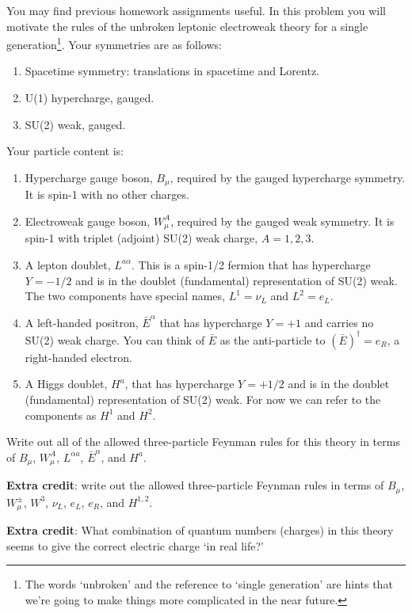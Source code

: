 \documentclass[12pt]{article}
\numberwithin{equation}{section}    %
\begin{document}
You may find previous homework assignments useful. In this problem you will motivate the rules of the unbroken leptonic electroweak theory for a single generation\footnote{The words `unbroken' and the reference to `single generation' are hints that we're going to make things more complicated in the near future.}. Your symmetries are as follows:
\begin{enumerate}
	\item Spacetime symmetry: translations in spacetime and Lorentz.
	\item U(1) hypercharge, gauged.
	\item SU(2) weak, gauged.
\end{enumerate}
Your particle content is:
\begin{enumerate}
	\item Hypercharge gauge boson, $B_\mu$, required by the gauged hypercharge symmetry. It is spin-1 with no other charges.
	\item Electroweak gauge boson, $W^A_\mu$, required by the gauged weak symmetry. It is spin-1 with triplet (adjoint) SU(2) weak charge, $A=1,2,3$.
	\item A lepton doublet, $L^{a\alpha}$. This is a spin-1/2 fermion that has hypercharge $Y=-1/2$ and is in the doublet (fundamental) representation of SU(2) weak. The two components have special names, $L^1 = \nu_L$ and $L^2 = e_L$.
	\item A left-handed positron, $\bar E^\alpha$ that has hypercharge $Y=+1$ and carries no SU(2) weak charge. You can think of $\bar E$ as the anti-particle to $(\bar E)^\dag = e_R$, a right-handed electron.
	\item A Higgs doublet, $H^a$, that has hypercharge $Y=+1/2$ and is in the doublet (fundamental) representation of SU(2) weak. For now we can refer to the components as $H^1$ and $H^2$.
\end{enumerate}
Write out all of the allowed three-particle Feynman rules for this theory in terms of $B_\mu$, $W_\mu^A$, $L^{\alpha a}$, $\bar E^\alpha$, and $H^a$. 

\textbf{Extra credit}: write out the allowed three-particle Feynman rules in terms of $B_\mu$, $W_\mu^\pm$, $W^3$, $\nu_L$, $e_L$, $e_R$, and $H^{1,2}$. 

\textbf{Extra credit}: What combination of quantum numbers (charges) in this theory seems to give the correct electric charge `in real life?'
\end{document}
